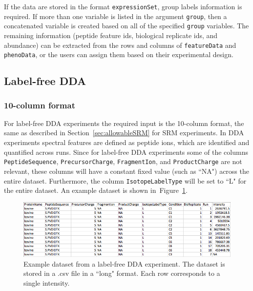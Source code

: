 \documentclass[11pt]{article}
\def\figref#1{Figure~\ref{fig:#1}}
\def\secref#1{Section~\ref{sec:#1}}
\begin{document}
If the data are stored in the format {\tt expressionSet}, group labels information is required. If more than one variable is listed in the argument {\tt group}, then a concatenated variable is created based on all of the specified {\tt group} variables. The remaining information (peptide feature ids, biological replicate ids, and abundance) can be extracted from the rows and columns of {\tt featureData} and {\tt phenoData}, or the users can assign them based on their experimental design.


\subsection{Label-free DDA} 

\subsubsection{10-column format}

For label-free DDA experiments the required input is the 10-column format, the same as described in \secref{allowableSRM} for SRM experiments. In DDA experiments spectral features are defined as peptide ions, which are identified and quantified across runs. Since for label-free DDA experiments some of the columns {\tt PeptideSequence}, {\tt PrecursorCharge}, {\tt FragmentIon}, and {\tt ProductCharge} are not relevant, these columns will have a constant fixed value (such as ``NA") across the entire dataset. Furthermore, the column {\tt IsotopeLabelType} will be set to ``L" for the entire dataset. An example dataset is shown in~\figref{inputDDA}.

\begin{figure}[!h]
\centering 
\includegraphics[totalheight=1.5in, width=5.5in]{required_LCMS.png}
\vspace{-0.3cm}
\caption{\small Example dataset from a label-free DDA experiment. The dataset is stored in a .csv file in a ``long" format.  Each row corresponds to a single intensity.
\label{fig:inputDDA}}
\end{figure}


\end{document}
